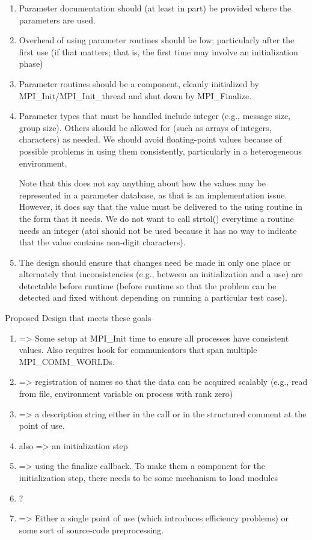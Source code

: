 \documentclass{report}
\begin{document}
\begin{enumerate}
\item Parameter documentation should (at least in part) be provided
      where the parameters are used.

\item Overhead of using parameter routines should be low; particularly 
      after the first use (if that matters; that is, the first time
      may involve an initialization phase)

\item Parameter routines should be a component, cleanly initialized by
      MPI\_Init/MPI\_Init\_thread and shut down by MPI\_Finalize.

\item Parameter types that must be handled include integer (e.g.,
      message size, group size).  Others should be allowed for (such
      as arrays of integers, characters) as needed.  We should avoid
      floating-point values because of possible problems in using them
      consistently, particularly in a heterogeneous environment.

      Note that this does not say anything about how the values may be
      represented in a parameter database, as that is an
      implementation issue.  However, it does say that the value must
      be delivered to the using routine in the form that it needs.  We
      do not want to call strtol() everytime a routine needs an
      integer (atoi should not be used because it has no way to
      indicate that the value contains non-digit characters).

\item The design should ensure that changes need be made in only one
      place or alternately that inconsistencies (e.g., between an
      initialization and a use) are detectable before runtime (before
      runtime so that the problem can be detected and fixed without
      depending on running a particular test case).

\end{enumerate}
Proposed Design that meets these goals

\begin{enumerate}
\item => Some setup at MPI\_Init time to ensure all processes have
consistent values.  Also requires hook for communicators that span
multiple MPI\_COMM\_WORLDs.
\item => registration of names so that the data can be acquired scalably
(e.g., read from file, environment variable on process with rank zero)
\item => a description string either in the call or in the structured
   comment at the point of use.
\item also => an initialization step 
\item => using the finalize callback.  To make them a component for the
initialization step, there needs to be some mechanism to load modules
\item ?
\item => Either a single point of use (which introduces efficiency
problems) or some sort of source-code preprocessing.  
\end{enumerate}
\end{document}
